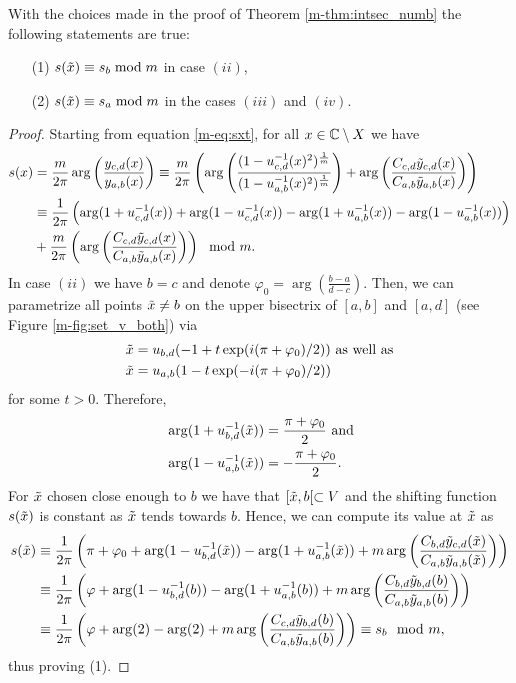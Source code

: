 \documentclass[main.tex]{subfiles}
\begin{document}
\begin{lemma}\label{lemma:sxt=sx}
  With the choices made in the proof of Theorem \ref{m-thm:intsec_numb} the following statements are true:
  \begin{itemize}
   \item[(1)] $s(\tilde{x}) \equiv s_b \bmod m$ in case $(ii)$,
    \item[(2)]  $s(\tilde{x}) \equiv s_a \bmod m$ in the cases $(iii)$ and $(iv)$.
  \end{itemize}
\end{lemma}
 \begin{proof}
 Starting from equation \eqref{m-eq:sxt}, for all $x \in \mathbb{C} \setminus X$ we have
   \begin{align*}
   s(x) & = \frac{m}{2\pi} \arg \left( \frac{y_{c,d}(x)}{y_{a,b}(x)} \right)
   \equiv \frac{m}{2\pi} \left( \arg \left( \frac{(1- u_{c,d}^{-1}(x)^2)^{\frac{1}{m}}}{(1-u_{a,b}^{-1}(x)^2)^{\frac{1}{m}}} \right) + \arg \left( \frac{ C_{c,d} \tilde{y}_{c,d}(x)}{C_{a,b}
   \tilde{y}_{a,b}(x)} \right) \right) \\
   & \equiv \frac{1}{2\pi} \left( \arg(1+u_{c,d}^{-1}(x)) + \arg(1-u_{c,d}^{-1}(x)) - \arg(1+u_{a,b}^{-1}(x)) - \arg(1-u_{a,b}^{-1}(x)) \right) \\
   & +  \frac{m}{2\pi} \left( \arg \left( \frac{ C_{c,d} \tilde{y}_{c,d}(x)}{C_{a,b}\tilde{y}_{a,b}(x)} \right)\right) \mod m.
  \end{align*}
 In case $(ii)$ we have $b = c$ and denote $\varphi_0 = \arg \left( \frac{b-a}{d-c} \right)$. Then, we can parametrize all points $\tilde{x} \ne b$ on 
 the upper bisectrix of $[a,b]$ and
 $[a,d]$ (see Figure \ref{m-fig:set_v_both}) via
 \begin{align*}
  \tilde{x} & = u_{b,d}(-1+t \exp(i(\pi+\varphi_0)/2)) \text{  as well as} \\
  \tilde{x} & = u_{a,b}(1-t \exp(-i (\pi+\varphi_0)/2))
 \end{align*}
 for some $t > 0$. Therefore,
 \begin{align*}
   & \arg (1+u_{b,d}^{-1}(\tilde{x})) = \frac{\pi+\varphi_0}{2} \text{ and} \\
   & \arg (1-u_{a,b}^{-1}(\tilde{x})) = -\frac{\pi+\varphi_0}{2}.
 \end{align*}
 For $\tilde{x}$ chosen close enough to $b$ we have that $[\tilde{x},b[ \subset V$ and the shifting function $s(\tilde{x})$ is constant as $\tilde{x}$ tends towards $b$. Hence, 
 we can compute its value at $\tilde{x}$ as
 \begin{align*}
  s(\tilde{x}) & \equiv \frac{1}{2\pi} \left( \pi + \varphi_0 + \arg(1-u_{b,d}^{-1}(\tilde{x})) - \arg(1+u_{a,b}^{-1}(\tilde{x})) +  m \arg \left( \frac{ C_{b,d} \tilde{y}_{c,d}(\tilde{x})}{C_{a,b}\tilde{y}_{a,b}(\tilde{x})} \right)\right) \\
	 & \equiv \frac{1}{2\pi} \left ( \varphi +\arg(1-u_{b,d}^{-1}(b)) - \arg(1+u_{a,b}^{-1}(b)) +  m \arg \left( \frac{ C_{b,d} \tilde{y}_{b,d}(b)}{C_{a,b}\tilde{y}_{a,b}(b)} \right)\right) \\
	 & \equiv \frac{1}{2\pi} \left( \varphi +\arg(2) - \arg(2) +  m \arg \left( \frac{ C_{c,d} \tilde{y}_{b,d}(b)}{C_{a,b}\tilde{y}_{a,b}(b)} \right)\right) \equiv s_b \mod m,
 \end{align*}
thus proving (1).


\end{proof}
\end{document}
